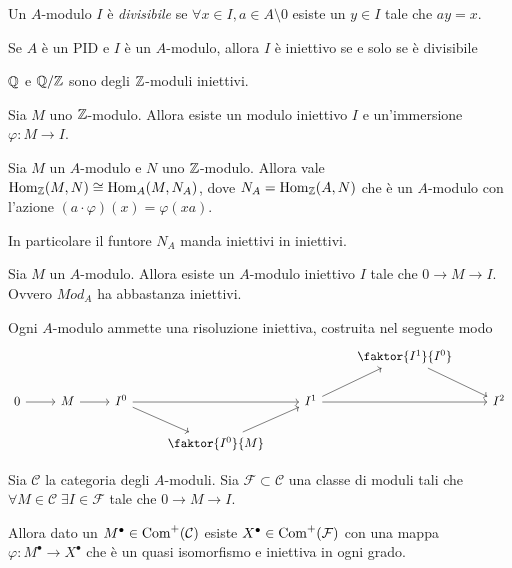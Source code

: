 \begin{definition}
    Un $A$-modulo $I$ è \emph{divisibile} se $\forall x\in I,a\in A\setminus 0$ esiste un $y\in I$ tale che $ay=x$. 
\end{definition}

\begin{theorem}
    Se $A$ è un PID e $I$ è un $A$-modulo, allora $I$ è iniettivo se e solo se è divisibile
\end{theorem}
\begin{corollary}
    $\mathbb{Q}$ e $\mathbb{Q}/\mathbb{Z}$ sono degli $\mathbb{Z}$-moduli iniettivi.
\end{corollary}

\begin{proposition}
    Sia $M$ uno $\mathbb{Z}$-modulo. Allora esiste un modulo iniettivo $I$ e un'immersione $\varphi:M\to I$.
\end{proposition}

\begin{lemma}
    Sia $M$ un $A$-modulo e $N$ uno $\mathbb{Z}$-modulo. Allora vale $\operatorname{Hom}_{\mathbb{Z}}(M,N)\cong\operatorname{Hom}_A(M,N_A)$, dove $N_A=\operatorname{Hom}_{\mathbb{Z}}(A,N)$ che è un $A$-modulo con l'azione $(a\cdot\varphi)(x)=\varphi(xa)$.
    
    In particolare il funtore $N_A$ manda iniettivi in iniettivi.
\end{lemma}

\begin{theorem}
    Sia $M$ un $A$-modulo. Allora esiste un $A$-modulo iniettivo $I$ tale che $0\to M\to I$. Ovvero $Mod_A$ ha abbastanza iniettivi.
\end{theorem}

\begin{corollary}
    Ogni $A$-modulo ammette una risoluzione iniettiva, costruita nel seguente modo
    $$\begin{tikzcd}
    & & & & & \faktor{I^1}{I^0} \ar[dr] & \\
    0 \ar[r] & M \ar[r] & I^0 \ar[dr] \ar[rr]  & & I^1 \ar[ur] \ar[rr] & & I^2\\
    & & & \faktor{I^0}{M} \ar[ur] & & &
    \end{tikzcd}$$
\end{corollary}


\begin{theorem}
    Sia $\mathcal C$ la categoria degli $A$-moduli. Sia $\mathcal F\subset \mathcal C$ una classe di moduli tali che $\forall M\in\mathcal C\;\exists I\in\mathcal F$ tale che $0\to M\to I$.
    
    Allora dato un $M^\bullet\in \operatorname{Com}^+(\mathcal C)$ esiste $X^\bullet\in\operatorname{Com}^+(\mathcal F)$ con una mappa $\varphi:M^\bullet\to X^\bullet$ che è un quasi isomorfismo e iniettiva in ogni grado.
\end{theorem}


